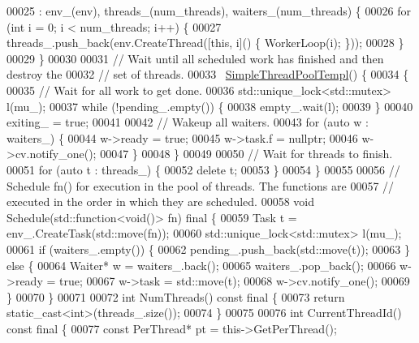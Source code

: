 \begin{DoxyCode}
00025       : env\_(env), threads\_(num\_threads), waiters\_(num\_threads) \{
00026     \textcolor{keywordflow}{for} (\textcolor{keywordtype}{int} i = 0; i < num\_threads; i++) \{
00027       threads\_.push\_back(env.CreateThread([\textcolor{keyword}{this}, i]() \{ WorkerLoop(i); \}));
00028     \}
00029   \}
00030 
00031   \textcolor{comment}{// Wait until all scheduled work has finished and then destroy the}
00032   \textcolor{comment}{// set of threads.}
00033   ~\hyperlink{class_eigen_1_1_simple_thread_pool_templ}{SimpleThreadPoolTempl}() \{
00034     \{
00035       \textcolor{comment}{// Wait for all work to get done.}
00036       std::unique\_lock<std::mutex> l(mu\_);
00037       \textcolor{keywordflow}{while} (!pending\_.empty()) \{
00038         empty\_.wait(l);
00039       \}
00040       exiting\_ = \textcolor{keyword}{true};
00041 
00042       \textcolor{comment}{// Wakeup all waiters.}
00043       \textcolor{keywordflow}{for} (\textcolor{keyword}{auto} w : waiters\_) \{
00044         w->ready = \textcolor{keyword}{true};
00045         w->task.f = \textcolor{keyword}{nullptr};
00046         w->cv.notify\_one();
00047       \}
00048     \}
00049 
00050     \textcolor{comment}{// Wait for threads to finish.}
00051     \textcolor{keywordflow}{for} (\textcolor{keyword}{auto} t : threads\_) \{
00052       \textcolor{keyword}{delete} t;
00053     \}
00054   \}
00055 
00056   \textcolor{comment}{// Schedule fn() for execution in the pool of threads. The functions are}
00057   \textcolor{comment}{// executed in the order in which they are scheduled.}
00058   \textcolor{keywordtype}{void} Schedule(std::function<\textcolor{keywordtype}{void}()> fn) \textcolor{keyword}{final} \{
00059     Task t = env\_.CreateTask(std::move(fn));
00060     std::unique\_lock<std::mutex> l(mu\_);
00061     \textcolor{keywordflow}{if} (waiters\_.empty()) \{
00062       pending\_.push\_back(std::move(t));
00063     \} \textcolor{keywordflow}{else} \{
00064       Waiter* w = waiters\_.back();
00065       waiters\_.pop\_back();
00066       w->ready = \textcolor{keyword}{true};
00067       w->task = std::move(t);
00068       w->cv.notify\_one();
00069     \}
00070   \}
00071 
00072   \textcolor{keywordtype}{int} NumThreads() \textcolor{keyword}{const} \textcolor{keyword}{final} \{
00073     \textcolor{keywordflow}{return} \textcolor{keyword}{static\_cast<}\textcolor{keywordtype}{int}\textcolor{keyword}{>}(threads\_.size());
00074   \}
00075 
00076   \textcolor{keywordtype}{int} CurrentThreadId() \textcolor{keyword}{const} \textcolor{keyword}{final} \{
00077     \textcolor{keyword}{const} PerThread* pt = this->GetPerThread();

\end{DoxyCode}
